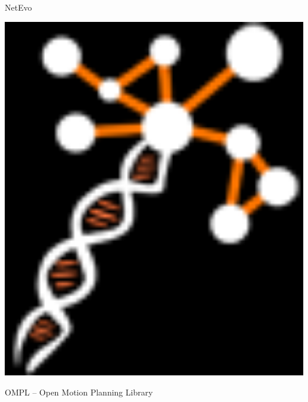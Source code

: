 \begin{frame}[fragile]
 

\vspace{4ex}



\begin{minipage}{0.2\textwidth}
 \begin{center}
  NetEvo

  \vspace{1ex}
  
  \includegraphics[draft=false,width=1.0\textwidth]{netevo.png}
 \end{center}
\end{minipage}
\hspace{4ex}\begin{minipage}{0.4\textwidth}
 \begin{center}
  OMPL -- Open Motion Planning Library
 \end{center}
\end{minipage}


\end{frame}





